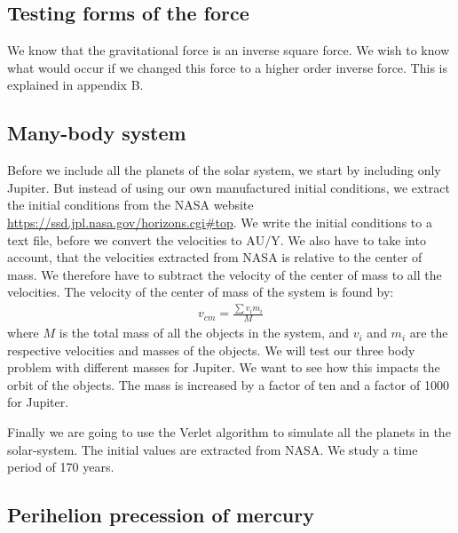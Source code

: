 \documentclass{article}
\begin{document}
\begin{multicols}{2}
\subsection{Testing forms of the force}

We know that the gravitational force is an inverse square force. We wish to know what would occur if we changed this force to a higher order inverse force. This is explained in appendix B.

\subsection{Many-body system}

Before we include all the planets of the solar system, we start by including only Jupiter. But instead of using our own manufactured initial conditions, we extract the initial conditions from the NASA website \url{https://ssd.jpl.nasa.gov/horizons.cgi#top}. We write the initial conditions to a text file, before we convert the velocities to $\text{AU/Y}$. We also have to take into account, that the velocities extracted from NASA is relative to the center of mass. We therefore have to subtract the velocity of the center of mass to all the velocities. The velocity of the center of mass of the system is found by:
\begin{align}
v_{cm} = \frac{\sum v_i m_i}{M}
\end{align}
where $M$ is the total mass of all the objects in the system, and $v_i$ and $m_i$ are the respective velocities and masses of the objects. We will test our three body problem with different masses for Jupiter. We want to see how this impacts the orbit of the objects. The mass is increased by a factor of ten and a factor of 1000 for Jupiter. 

Finally we are going to use the Verlet algorithm to simulate all the planets in the solar-system. The initial values are extracted from NASA. We study a time period of 170 years. 

\subsection{Perihelion precession of mercury}


\end{multicols}
\end{document}
